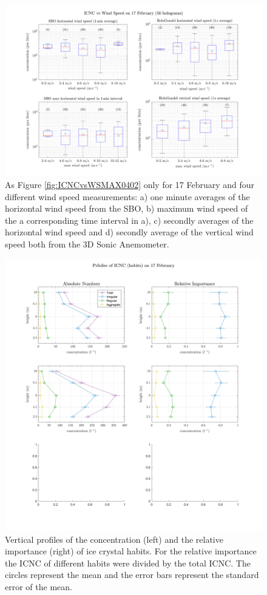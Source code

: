 \documentclass[draft,linenumbers]{agujournal}
\begin{document}
\begin{figure}[t]
 \centering
 	\includegraphics[width=14cm]{1702_OverviewWS.png}
 \caption{As Figure \ref{fig:ICNCvsWSMAX0402} only for 17 February and four different wind speed measurements: a) one minute averages of the horizontal wind speed from the SBO, b) maximum wind speed of the a corresponding time interval in a), c) secondly averages of the horizontal wind speed and d) secondly average of the vertical wind speed both from the 3D Sonic Anemometer.}
 \label{fig:ICNCvsWind1702}
\end{figure}

\begin{figure}[t]
 \centering
 	\includegraphics[width=14cm]{1702_habitsHeight.png}
 \caption{Vertical profiles of the concentration (left) and the relative importance (right) of ice crystal habits. For the relative importance the ICNC of different habits were divided by the total ICNC. The circles represent the mean and the error bars represent the standard error of the mean. }
 \label{fig:profilesHabits1702}
\end{figure}
\end{document}
